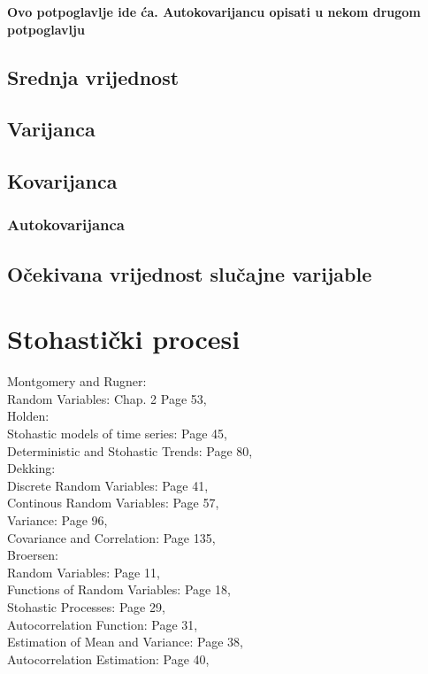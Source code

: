 \documentclass[a4paper,12pt,oneside]{memoir}
\begin{document}
            \textbf{Ovo potpoglavlje ide ća. Autokovarijancu opisati u nekom drugom potpoglavlju}
            \subsection{Srednja vrijednost}
            \subsection{Varijanca}
            \subsection{Kovarijanca}
                \subsubsection{Autokovarijanca}
            \subsection{Očekivana vrijednost slučajne varijable}

        \section{Stohastički procesi} \label{stoh_proc}
            Montgomery and Rugner:\\
            Random Variables: Chap. 2 Page 53,\\

            Holden:\\
            Stohastic models of time series: Page 45,\\
            Deterministic and Stohastic Trends: Page 80,\\

            Dekking:\\
            Discrete Random Variables: Page 41,\\
            Continous Random Variables: Page 57,\\
            Variance: Page 96,\\
            Covariance and Correlation: Page 135,\\


            Broersen:\\
            Random Variables: Page 11,\\
            Functions of Random Variables: Page 18,\\
            Stohastic Processes: Page 29,\\
            Autocorrelation Function: Page 31,\\
            Estimation of Mean and Variance: Page 38,\\
            Autocorrelation Estimation: Page 40,\\
\end{document}
